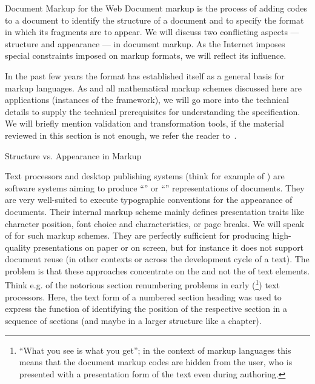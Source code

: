 
\begin{tchapter}[id=markup-web]{Document Markup for the Web}
Document markup is the process of adding codes to a document to identify the
structure of a document and to specify the format in which its fragments are to
appear. We will discuss two conflicting aspects --- structure and appearance ---
in document markup. As the Internet imposes special constraints imposed on markup
formats, we will reflect its influence.

In the past few years the {\xml} format has established itself as a general basis for
markup languages. As {\omdoc} and all mathematical markup schemes discussed here are
{\xml} applications (instances of the {\xml}
framework), we will go more into the technical details to supply
the technical prerequisites for understanding the specification.  We will briefly mention
{\xml} validation and transformation tools, if the material reviewed in this section is
not enough, we refer the reader to~\cite{Harold:xb01}.

\begin{tsection}[id=markup-types]{Structure vs. Appearance in Markup}

  Text processors and desktop publishing systems (think for example of
  {}) are software systems aiming to produce
  ``{}'' or ``{}'' representations of documents.
  They are very well-suited to execute typographic conventions for the appearance of
  documents. Their internal markup scheme mainly defines presentation traits like
  character position, font choice and characteristics, or page breaks.  We will speak of
  {} for such markup schemes.  They are perfectly sufficient
  for producing high-quality presentations on paper or on screen, but for instance it does
  not support document reuse (in other contexts or across the development cycle of a
  text). The problem is that these approaches concentrate on the {} and not the
  {} of text elements.  Think e.g. of the notorious section renumbering
  problems in early ({}\footnote{``What you see is what you get''; in
    the context of markup languages this means that the document markup codes are hidden
    from the user, who is presented with a presentation form of the text even during
    authoring.}) text processors.  Here, the text form of a numbered section heading was
  used to express the function of identifying the position of the respective section in a
  sequence of sections (and maybe in a larger structure like a chapter).


\end{tsection}
\end{tchapter}
